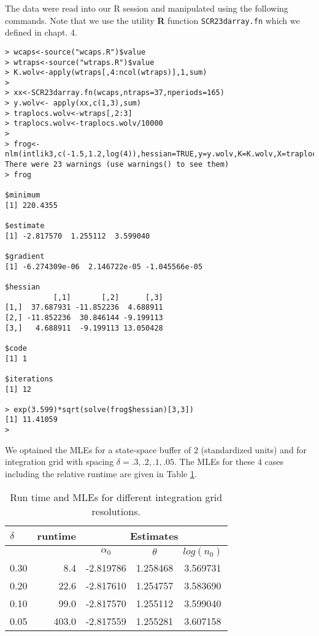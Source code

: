 The data were read into our R session and manipulated using the
following commands. Note that we use the utility {\bf R} function
\mbox{\tt SCR23darray.fn} which we defined in chapt. 4.

\begin{verbatim}
> wcaps<-source("wcaps.R")$value
> wtraps<-source("wtraps.R")$value
> K.wolv<-apply(wtraps[,4:ncol(wtraps)],1,sum)
> 
> xx<-SCR23darray.fn(wcaps,ntraps=37,nperiods=165)
> y.wolv<- apply(xx,c(1,3),sum)
> traplocs.wolv<-wtraps[,2:3]
> traplocs.wolv<-traplocs.wolv/10000
>
> frog<-nlm(intlik3,c(-1.5,1.2,log(4)),hessian=TRUE,y=y.wolv,K=K.wolv,X=traplocs.wolv,delta=.1,ssbuffer=2)
There were 23 warnings (use warnings() to see them)
> frog

$minimum
[1] 220.4355

$estimate
[1] -2.817570  1.255112  3.599040

$gradient
[1] -6.274309e-06  2.146722e-05 -1.045566e-05

$hessian
           [,1]       [,2]      [,3]
[1,]  37.687931 -11.852236  4.688911
[2,] -11.852236  30.846144 -9.199113
[3,]   4.688911  -9.199113 13.050428

$code
[1] 1

$iterations
[1] 12

> exp(3.599)*sqrt(solve(frog$hessian)[3,3])
[1] 11.41059
> 

\end{verbatim}

We optained the MLEs for a state-space buffer of 2 (standardized
units) and for integration grid with spacing $\delta = .3, .2, .1,
.05$. The MLEs for these 4 cases including the relative runtime are
given in Table \ref{mle.tab.integration}.

\begin{table}[ht]
\centering
\caption{Run time and MLEs for different integration grid resolutions.}
\begin{tabular}{l|rccc}
\hline \hline
$\delta$ &  runtime & \multicolumn{3}{c}{Estimates} \\ \hline
         &          & $\alpha_0$ & $\theta$ & $log(n_0)$ \\ \hline
 0.30   &  8.4  &  -2.819786 & 1.258468 & 3.569731  \\
 0.20   & 22.6  &  -2.817610 & 1.254757 & 3.583690 \\
 0.10  &  99.0  &  -2.817570 & 1.255112 & 3.599040 \\
 0.05 &  403.0 &   -2.817559&  1.255281&  3.607158 \\
\end{tabular}
\label{mle.tab.integration}
\end{table}


